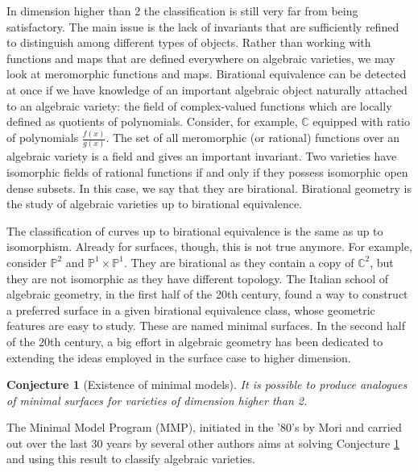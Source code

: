 \documentclass[10.9pt]{res} %
\numberwithin{equation}{section}
\newtheorem{conjecture}[theorem]{Conjecture}
\theoremstyle{definition}
\begin{document}
\begin{resume}
In dimension higher than 2 the classification is still very far from being satisfactory. 
The main issue is the lack of invariants that are sufficiently refined to distinguish among different types of objects. 
Rather than working with functions and maps that are defined everywhere on algebraic varieties, 
we may look at meromorphic functions and maps. Birational equivalence can be detected at once if we have knowledge of an important algebraic 
object naturally attached to an algebraic variety: the field of complex-valued functions which are locally defined as quotients of polynomials. 
Consider, for example, $\mathbb{C}$ equipped with ratio of polynomials $\frac{f(x)}{g(x)}$. \newline
The set of all meromorphic (or rational) functions over an algebraic variety is a field and gives an important invariant. 
Two varieties have isomorphic fields of rational functions if and only if they possess isomorphic
open dense subsets. In this case, we say that they are birational. Birational geometry is the study of algebraic varieties up to 
birational equivalence.

The classification of curves up to birational equivalence is the same as up to isomorphism. 
Already for surfaces, though, this is not true anymore. 
For example, consider $\mathbb{P}^2$ and $\mathbb{P}^1 \times \mathbb{P}^1$. They are birational as they contain a copy of 
$\mathbb{C}^2$, but they are not isomorphic as they have different topology.
The Italian school of algebraic geometry, in the first half of the 20th century, 
found a way to construct a preferred surface	 in a given birational equivalence class, whose geometric features are easy to study. 
These are named minimal surfaces. In the second half of the 20th century, a big effort in algebraic geometry has been dedicated to 
extending the ideas employed in the surface case to higher dimension.
\begin{conjecture}[Existence of minimal models]
\label{question.mmp}
It is possible to produce analogues of minimal surfaces for varieties of dimension higher than 2.
\end{conjecture}
\vspace{-8pt}
The Minimal Model Program (MMP), initiated in the '80's by Mori and carried out over the last 30 years by several other 
authors aims at solving Conjecture \ref{question.mmp} and using this result to classify algebraic varieties.


\end{resume}
\end{document}
